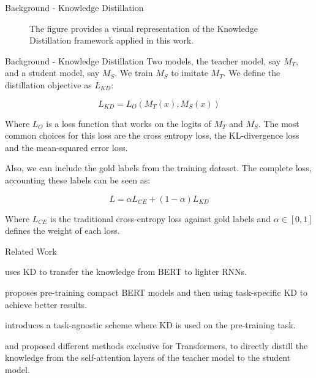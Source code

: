 \documentclass[aspectratio=169,xcolor=dvipsnames]{beamer}
\newenvironment{wideitemize}{\itemize\addtolength{\itemsep}{10pt}}{\enditemize}
\begin{document}
\begin{frame}{Background - Knowledge Distillation}
\centering
\begin{figure}
    
    \caption{The figure provides a visual representation of the Knowledge Distillation \citep{hinton2015distilling} framework applied in this work.}
    \label{fig:kd-overview}
\end{figure}
\end{frame}
\begin{frame}{Background - Knowledge Distillation}
Two models, the teacher model, say $M_T$, and a student model, say $M_S$. We train $M_S$ to imitate $M_T$. We define the distillation objective as $L_{KD}$:

$$L_{KD} = L_O(M_T(x), M_S(x))$$

Where $L_O$ is a loss function that works on the logits of $M_T$ and $M_S$. The most common choices for this loss are the cross entropy loss, the KL-divergence loss and the mean-squared error loss.

Also, we can include the gold labels from the training dataset. The complete loss, accounting these labels can be seen as:

$$L = \alpha L_{CE} + (1 - \alpha) L_{KD}$$

Where $L_{CE}$ is the traditional cross-entropy loss against gold labels and $\alpha \in [0, 1]$ defines the weight of each loss.
\end{frame}
\begin{frame}{Related Work}
\begin{wideitemize}
    \item \citet{tang-distilling-2019} uses KD to transfer the knowledge from BERT to lighter RNNs. 
    \item \citet{turc2019} proposes pre-training compact BERT models and then using task-specific KD to achieve better results.
    \item \citet{distilbert-sanh} introduces a task-agnostic scheme where KD is used on the pre-training task.
    \item \citet{wang-minilm} and \citet{jiao-etal-2020-tinybert} proposed different methods exclusive for Transformers, to directly distill the knowledge from the self-attention layers of the teacher model to the student model.
\end{wideitemize} 
\end{frame}
\end{document}
